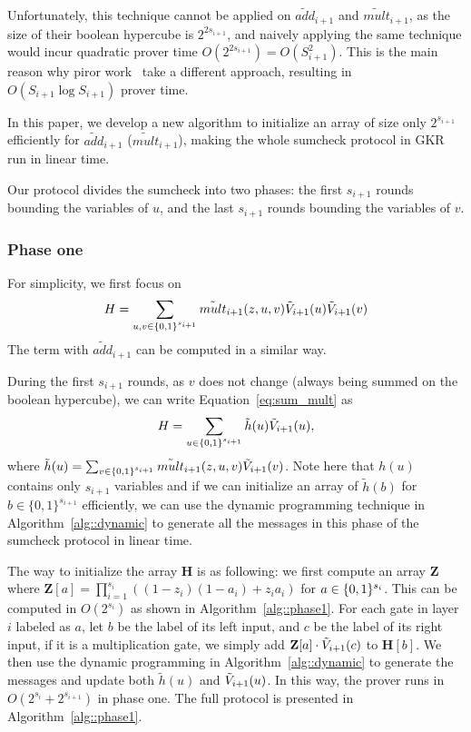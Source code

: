 Unfortunately, this technique cannot be applied on $\tilde{add}_{i+1}$ and $\tilde{mult}_{i+1}$, as the size of their boolean hypercube is $2^{2s_{i+1}}$, and naively applying the same technique would incur quadratic prover time $O(2^{2s_{i+1}}) = O(S_{i+1}^2)$. This is the main reason why piror work~\cite{CMT,...} take a different approach, resulting in $O(S_{i+1}\log S_{i+1})$ prover time.

In this paper, we develop a new algorithm to initialize an array of size only $2^{s_{i+1}}$ efficiently for $\tilde{add}_{i+1}$ ($\tilde{mult}_{i+1}$), making the whole sumcheck protocol in GKR run in linear time. 

Our protocol divides the sumcheck into two phases: the first $s_{i+1}$ rounds bounding the variables of $u$, and the last $s_{i+1}$ rounds bounding the variables of $v$.

\subsubsection{Phase one}

For simplicity, we first focus on 
\begin{equation}\label{eq:sum_mult}
H = \sum_{u, v \in \{0,1\}^{s_{i+1}}}\tilde{mult}_{i+1}(z,u,v)\tilde{V}_{i+1}(u)\tilde{V}_{i+1}(v)
\end{equation}
The term with $\tilde{add}_{i+1}$ can be computed in a similar way. 

During the first $s_{i+1}$ rounds, as $v$ does not change (always being summed on the boolean hypercube), we can write Equation~\ref{eq:sum_mult} as 
\[
H = \sum_{u\in\{0,1\}^{s_{i+1}}}\tilde{h}(u)\tilde{V}_{i+1}(u),
\]
where $\tilde{h}(u) = \sum_{v\in\{0,1\}^{s_{i+1}}}\tilde{mult}_{i+1}(z,u,v)\tilde{V}_{i+1}(v)$. Note here that $h(u)$ contains only $s_{i+1}$ variables and if we can initialize an array of $\tilde{h}(b)$ for $b\in\{0,1\}^{s_{i+1}}$ efficiently, we can use the dynamic programming technique in Algorithm~\ref{alg::dynamic} to generate all the messages in this phase of the sumcheck protocol in linear time. 

The way to initialize the array \textbf{H} is as following: we first compute an array \textbf{Z} where $\textbf{Z}[a] = \prod_{i=1}^{s_i} ((1-z_i)(1-a_i)+z_ia_i)$ for $a\in\{0,1\}^{s_{i}}$. This can be computed in $O(2^{s_i})$ as shown in Algorithm~\ref{alg::phase1}. For each gate in layer $i$ labeled as $a$, let $b$ be the label of its left input, and $c$ be the label of its right input, if it is a multiplication gate, we simply add $\textbf{Z}[a]\cdot \tilde{V}_{i+1}(c)$ to $\textbf{H}[b]$. We then use the dynamic programming in Algorithm~\ref{alg::dynamic} to generate the messages and update both $\tilde{h}(u)$ and $\tilde{V}_{i+1}(u)$. In this way, the prover runs in $O(2^{s_i}+2^{s_{i+1}})$ in phase one. The full protocol is presented in Algorithm~\ref{alg::phase1}.

